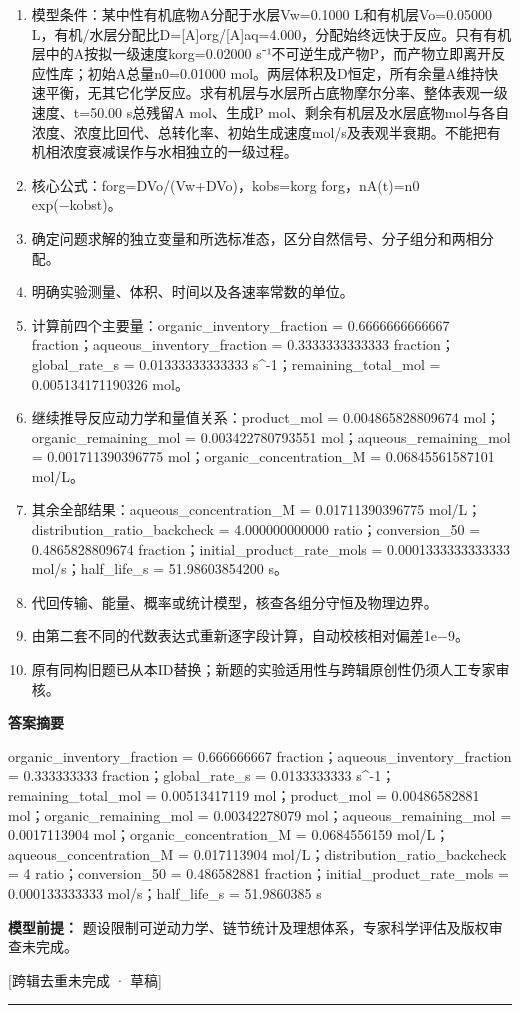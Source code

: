 \documentclass[UTF8,11pt,a4paper]{ctexart}
\begin{document}
\begin{enumerate}
\item 模型条件：某中性有机底物A分配于水层Vw=0.1000 L和有机层Vo=0.05000 L，有机/水层分配比D=[A]org/[A]aq=4.000，分配始终远快于反应。只有有机层中的A按拟一级速度korg=0.02000 s⁻¹不可逆生成产物P，而产物立即离开反应性库；初始A总量n0=0.01000 mol。两层体积及D恒定，所有余量A维持快速平衡，无其它化学反应。求有机层与水层所占底物摩尔分率、整体表观一级速度、t=50.00 s总残留A mol、生成P mol、剩余有机层及水层底物mol与各自浓度、浓度比回代、总转化率、初始生成速度mol/s及表观半衰期。不能把有机相浓度衰减误作与水相独立的一级过程。
\item 核心公式：forg=DVo/(Vw+DVo)，kobs=korg forg，nA(t)=n0 exp(−kobst)。
\item 确定问题求解的独立变量和所选标准态，区分自然信号、分子组分和两相分配。
\item 明确实验测量、体积、时间以及各速率常数的单位。
\item 计算前四个主要量：organic\_inventory\_fraction = 0.6666666666667 fraction；aqueous\_inventory\_fraction = 0.3333333333333 fraction；global\_rate\_s = 0.01333333333333 s\textasciicircum{}-1；remaining\_total\_mol = 0.005134171190326 mol。
\item 继续推导反应动力学和量值关系：product\_mol = 0.004865828809674 mol；organic\_remaining\_mol = 0.003422780793551 mol；aqueous\_remaining\_mol = 0.001711390396775 mol；organic\_concentration\_M = 0.06845561587101 mol/L。
\item 其余全部结果：aqueous\_concentration\_M = 0.01711390396775 mol/L；distribution\_ratio\_backcheck = 4.000000000000 ratio；conversion\_50 = 0.4865828809674 fraction；initial\_product\_rate\_mols = 0.0001333333333333 mol/s；half\_life\_s = 51.98603854200 s。
\item 代回传输、能量、概率或统计模型，核查各组分守恒及物理边界。
\item 由第二套不同的代数表达式重新逐字段计算，自动校核相对偏差1e−9。
\item 原有同构旧题已从本ID替换；新题的实验适用性与跨辑原创性仍须人工专家审核。
\end{enumerate}
\noindent\textbf{答案摘要}\par
organic\_inventory\_fraction = 0.666666667 fraction；aqueous\_inventory\_fraction = 0.333333333 fraction；global\_rate\_s = 0.0133333333 s\textasciicircum{}-1；remaining\_total\_mol = 0.00513417119 mol；product\_mol = 0.00486582881 mol；organic\_remaining\_mol = 0.00342278079 mol；aqueous\_remaining\_mol = 0.0017113904 mol；organic\_concentration\_M = 0.0684556159 mol/L；aqueous\_concentration\_M = 0.017113904 mol/L；distribution\_ratio\_backcheck = 4 ratio；conversion\_50 = 0.486582881 fraction；initial\_product\_rate\_mols = 0.000133333333 mol/s；half\_life\_s = 51.9860385 s\par
\noindent\textbf{模型前提：}
题设限制可逆动力学、链节统计及理想体系，专家科学评估及版权审查未完成。\par
\noindent\textcolor{red!65!black}{[跨辑去重未完成 · 草稿]} \par
\medskip\hrule\medskip
{}
\end{document}
